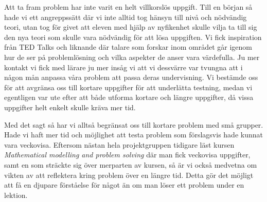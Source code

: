 \textcolor{Mahogany}{Att ta fram problem har inte varit en helt villkorslös uppgift. Till en början så hade vi ett angreppssätt där vi inte alltid tog hänsyn till nivå och nödvändig teori, utan tog för givet att eleven med hjälp av nyfikenhet skulle vilja ta till sig den nya teori som skulle vara nödvändig för att lösa uppgiften. Vi fick inspiration från TED Talks och liknande där talare som forskar inom området går igenom hur de ser på problemlösning och vilka aspekter de anser vara värdefulla. Ju mer kontakt vi fick med lärare ju mer insåg vi att vi dessvärre var tvungna att i någon mån anpassa våra problem att passa deras undervisning. Vi bestämde oss för att avgränsa oss till kortare uppgifter för att underlätta testning, medan vi egentligen var ute efter att både utforma kortare och längre uppgifter, då vissa uppgifter helt enkelt skulle kräva mer tid.}

\textcolor{Mahogany}{Med det sagt så har vi alltså begränsat oss till kortare problem med små grupper. Hade vi haft mer tid och möjlighet att testa problem som förslagsvis hade kunnat vara veckovisa. Eftersom nästan hela projektgruppen tidigare läst kursen \textsl{Mathematical modelling and problem solving}\cite{matmod} där man fick veckovisa uppgifter, samt en som sträckte sig över merparten av kursen, så är vi också medvetna om vikten av att reflektera kring problem över en längre tid. Detta gör det möjligt att få en djupare förståelse för något än om man löser ett problem under en lektion.}